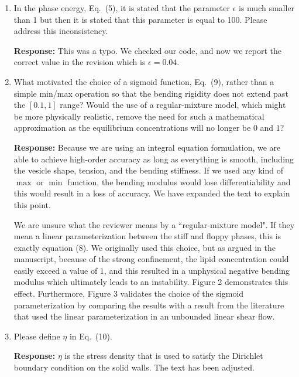 \documentclass[11pt]{article}
\begin{document}
\begin{enumerate}
\item In the phase energy, Eq.~(5), it is stated that the parameter
  $\epsilon$ is much smaller than 1 but then it is stated that this
    parameter is equal to 100. Please address this inconsistency.

\noindent
{\bf Response:} This was a typo. We checked our code, and now we
report the correct value in the revision which is $\epsilon = 0.04$.

\item What motivated the choice of a sigmoid function, Eq.~(9), rather
  than a simple min/max operation so that the bending rigidity does not
    extend past the $[0.1, 1]$ range? Would the use of a regular-mixture
    model, which might be more physically realistic, remove the need for
    such a mathematical approximation as the equilibrium concentrations
    will no longer be $0$ and $1$?

\noindent
{\bf Response:} Because we are using an integral equation formulation,
    we are able to achieve high-order accuracy as long as everything is
    smooth, including the vesicle shape, tension, and the bending
    stiffness. If we used any kind of $\max$ or $\min$ function, the
    bending modulus would lose differentiability and this would result
    in a loss of accuracy. We have expanded the text to explain this
    point.

    We are unsure what the reviewer means by a ``regular-mixture model".
    If they mean a linear parameterization between the stiff and floppy
    phases, this is exactly equation (8).  We originally used this
    choice, but as argued in the manuscript, because of the strong
    confinement, the lipid concentration could easily exceed a value of
    $1$, and this resulted in a unphysical negative bending modulus
    which ultimately leads to an instability.  Figure 2 demonstrates
    this effect. Furthermore, Figure 3 validates the choice of the
    sigmoid parameterization by comparing the results with a result from
    the literature that used the linear parameterization in an unbounded
    linear shear flow.

\item Please define $\eta$ in Eq.~(10). 

\noindent
{\bf Response:} $\eta$ is the stress density that is used to satisfy the
    Dirichlet boundary condition on the solid walls. The text has been
    adjusted.


\end{enumerate}
\end{document}
